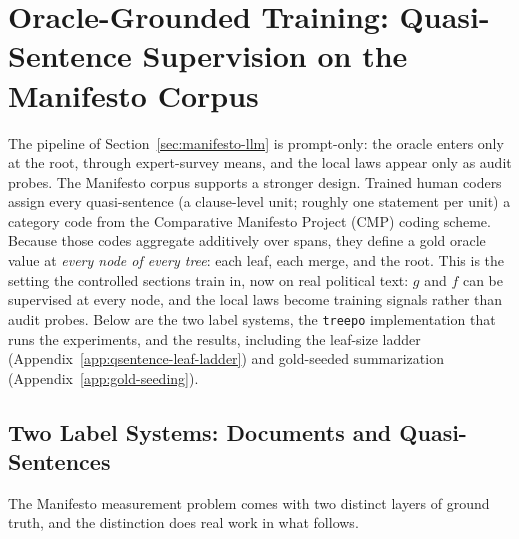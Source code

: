 \section{Oracle-Grounded Training: Quasi-Sentence Supervision on the Manifesto Corpus}\label{sec:manifesto-qsentence}

The pipeline of Section~\ref{sec:manifesto-llm} is prompt-only: the
oracle enters only at the root, through expert-survey means, and the
local laws appear only as audit probes. The Manifesto
corpus supports a stronger design. Trained human coders assign every
quasi-sentence (a clause-level unit; roughly one statement per unit) a
category code from the Comparative Manifesto Project (CMP) coding
scheme. Because those codes aggregate additively over spans, they
define a gold oracle value at \emph{every node of every tree}: each
leaf, each merge, and the root. This is the setting the controlled
sections train in, now on real political text: $g$ and $f$ can be
supervised at every node, and the local laws become training signals
rather than audit probes. Below are the two label systems,
the \texttt{treepo} implementation that runs the experiments, and the
results, including the leaf-size ladder (Appendix~\ref{app:qsentence-leaf-ladder})
and gold-seeded summarization (Appendix~\ref{app:gold-seeding}).

\subsection{Two Label Systems: Documents and Quasi-Sentences}\label{sec:qsentence-labels}

The Manifesto measurement problem comes with two distinct layers of
ground truth, and the distinction does real work in what follows.

